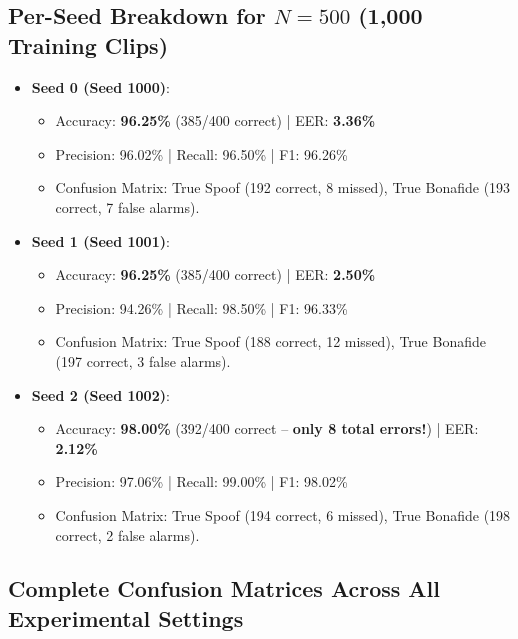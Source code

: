 \documentclass[11pt,a4paper]{article}
\begin{document}
\subsection{Per-Seed Breakdown for $N=500$ (1,000 Training Clips)}
\begin{itemize}
    \item \textbf{Seed 0 (Seed 1000)}:
    \begin{itemize}
        \item Accuracy: \textbf{96.25\%} (385/400 correct) \quad | \quad EER: \textbf{3.36\%}
        \item Precision: 96.02\% \quad | \quad Recall: 96.50\% \quad | \quad F1: 96.26\%
        \item Confusion Matrix: True Spoof (192 correct, 8 missed), True Bonafide (193 correct, 7 false alarms).
    \end{itemize}
    \item \textbf{Seed 1 (Seed 1001)}:
    \begin{itemize}
        \item Accuracy: \textbf{96.25\%} (385/400 correct) \quad | \quad EER: \textbf{2.50\%}
        \item Precision: 94.26\% \quad | \quad Recall: 98.50\% \quad | \quad F1: 96.33\%
        \item Confusion Matrix: True Spoof (188 correct, 12 missed), True Bonafide (197 correct, 3 false alarms).
    \end{itemize}
    \item \textbf{Seed 2 (Seed 1002)}:
    \begin{itemize}
        \item Accuracy: \textbf{98.00\%} (392/400 correct -- \textbf{only 8 total errors!}) \quad | \quad EER: \textbf{2.12\%}
        \item Precision: 97.06\% \quad | \quad Recall: 99.00\% \quad | \quad F1: 98.02\%
        \item Confusion Matrix: True Spoof (194 correct, 6 missed), True Bonafide (198 correct, 2 false alarms).
    \end{itemize}
\end{itemize}

\subsection{Complete Confusion Matrices Across All Experimental Settings}
\end{document}
